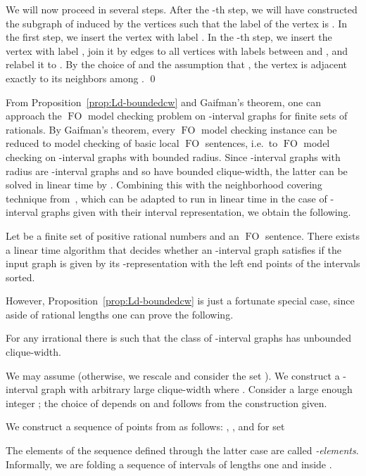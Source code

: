\documentclass{CSML}
\newcommand{\FO}{\ensuremath{\operatorname{FO}}\xspace}
\theoremstyle{plain}\newtheorem{claim}[thm]{Claim}
\begin{document}
We will now proceed in several steps. After the -th step,
we will have constructed the subgraph of  induced
by the vertices  such that
the label of the vertex  is .
In the first step, we insert the vertex  with label .
In the -th step, we insert the vertex  with label ,
join it by edges to all vertices with labels between  and , and
relabel it to .
By the choice of  and the assumption that ,
the vertex  is adjacent exactly to its neighbors among . 
\qed

From Proposition~\ref{prop:Ld-boundedcw} and Gaifman's theorem,
one can approach  the \FO model checking problem on -interval graphs
for finite sets  of rationals.
By Gaifman's theorem, every \FO model checking instance can be reduced to
model checking of basic local \FO sentences, i.e.~to \FO model checking on
-interval graphs with bounded radius.
Since -interval graphs with radius  are -interval graphs and so have bounded clique-width,
the latter can be solved in linear time by \cite{cmr00}.
Combining this with the neighborhood covering technique from~\cite{fg01},
which can be adapted to run in linear time in the case of -interval graphs given with their interval representation,
we obtain the following.

\begin{cor}
\label{cor:rationalFO}
Let  be a finite set of positive rational numbers and  an \FO sentence.
There exists a linear time algorithm that decides whether 
an -interval graph  satisfies 
if the input graph  is given by its -representation
with the left end points of the intervals sorted.
\end{cor}

However, Proposition~\ref{prop:Ld-boundedcw} is just a fortunate special case, 
since aside of rational lengths one can prove the following.

\begin{prop}
\label{prop:1qcw-unbounded}
For any irrational  there is  such that the class of
-interval graphs has unbounded clique-width.
\end{prop}

\proof
We may assume  (otherwise, we rescale and consider the set ).
We construct a -interval graph  with arbitrary large clique-width  where .
Consider a large enough integer ; the choice of  depends on  and follows from the construction given.

We construct a sequence  of  points from  as follows:
, , and for  set

The elements of the sequence defined through the latter case are called {\em -elements}.
Informally, we are folding a sequence of intervals of lengths one and  inside .
\end{document}
